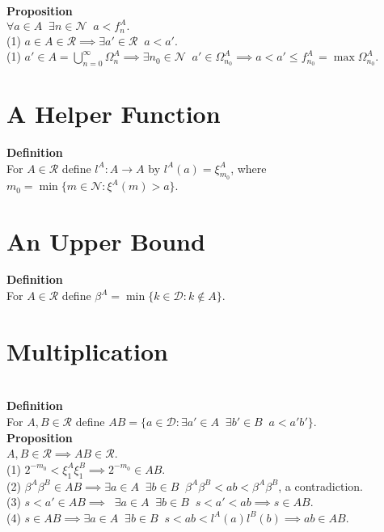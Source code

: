 \documentclass{article}
\newcommand{\targetset}{ \mathscr{R}}
\newcommand{\sourceset}{ \mathscr{D}}
\newcommand{\naturals}{ \mathscr{N}}
\newcommand{\carpenter}{ \xi }
\newcommand{\leaper}{l}
\newcommand{\elt}{a}
\newcommand{\altelt}{s}
\newcommand{\umbrella}{\beta}
\newcommand{\interceptor}{\Omega}
\begin{document}
\textbf{Proposition}\\
$\forall a \in A \;\; \exists n \in \naturals \;\; a < f^A_n.$\\ 

(1) $a \in A \in \targetset \implies \exists a' \in \targetset \;\; a <  a'$.\\
(1) $a' \in A = \bigcup_{n = 0}^\infty \interceptor^A_n \implies \exists n_0 \in \naturals \;\; a' \in \interceptor^A_{n_0} \implies a < a' \le f^A_{n_0} = \max \interceptor^A_{n_0}$.\\

\section{A Helper Function}

\textbf{Definition}\\
For $A \in \targetset$ define $\leaper^A : A \to A$ by $\leaper^A(a) = \carpenter^A_{m_0}$, where $m_0 = \min \{ m \in \naturals : \carpenter^A(m) > a \}.$\\


\section{An Upper Bound}

\textbf{Definition}\\
For $A \in \targetset$ define $\umbrella^A= \min \{ k \in \sourceset : k \notin A \}.$\\ 

\section{Multiplication}\\

\textbf{Definition}\\
For $A, B \in \targetset$ define $AB = \{ \elt \in \sourceset : \exists a' \in A \;\; \exists b' \in B \;\; \elt < a'b' \}.$\\

\textbf{Proposition}\\
$A, B \in \targetset \implies AB \in \targetset$.\\ 

(1) $2^{-m_0} < \carpenter^A_1 \carpenter^B_1  \implies 2^{-m_0} \in AB$.\\
(2) $\umbrella^A \umbrella^B \in AB \implies \exists a \in A \;\; \exists b \in B \;\; \umbrella^A \umbrella^B < ab < \umbrella^A \umbrella^B$, a contradiction. \\
(3) $ \altelt < \elt' \in AB \implies \;\; \exists a \in A \;\; \exists b \in B \;\; \altelt < \elt' < ab \implies \altelt \in AB$.\\ 
(4) $\altelt \in AB \implies \exists a \in A \;\; \exists b \in B \;\; \altelt < ab  < \leaper^A(a) \leaper^B(b) \implies ab \in AB.$\\
\end{document}
